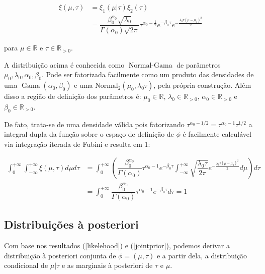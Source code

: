 \documentclass[a4paper]{article}
\newcommand{\op}[1]{{\operatorname{#1}}}
\begin{document}
  \begin{align}
  \xi(\mu,\tau)&=\xi_1(\mu|\tau)\xi_2(\tau)\nonumber\\
  &=\displaystyle\dfrac{\beta_0^{\alpha_0}\sqrt{\lambda_0}}{\Gamma(\alpha_0)\sqrt{2\pi}}\tau^{\alpha_0-\frac12}e^{-\beta_0\tau}e^{-\frac{\lambda_0\tau (\mu-\mu_0)^2}2}\label{jointprior}
  \end{align}
  \begin{center}para  $\mu\in\mathbb{R}$ e $\tau\in\mathbb{R}_{>0}$.\end{center}
\begin{definition}
	A distribuição acima é conhecida como $\op{Normal-Gama}$ de parâmetros $\mu_0,\lambda_0,\alpha_0,\beta_0$. Pode ser fatorizada facilmente como um produto das densidades de uma $\op{Gama}(\alpha_0,\beta_0)$ e uma $\op{Normal_2}(\mu_0,\lambda_0\tau)$, pela própria construção. Além disso a região de definição dos parâmetros é: $\mu_0\in\mathbb{R}$, $\lambda_0\in\mathbb{R}_{>0}$, $\alpha_0\in\mathbb{R}_{>0}$ e $\beta_0\in\mathbb{R}_{>0}$.\label{def1}
\end{definition}

De fato, trata-se de uma densidade válida pois fatorizando $\tau^{\alpha_0-1/2}=\tau^{\alpha_0-1}\tau^{1/2}$ a integral dupla da função sobre o espaço de definição de $\phi$ é facilmente calculável via integração iterada de Fubini\citep{wiki:Fubini's_theorem} e resulta em 1:

\begin{align*}
	\displaystyle \int_{0}^{+\infty}\int_{-\infty}^{+\infty}\xi(\mu,\tau)d\mu d\tau &=\int_{0}^{+\infty}\left(\dfrac{\beta_0^{\alpha_0}}{\Gamma(\alpha_0)}\tau^{\alpha_0-1}e^{-\beta_0\tau}\int_{-\infty}^{+\infty}\sqrt{\dfrac{\lambda_0\tau}{2\pi}}e^{-\frac{\lambda_0\tau (\mu-\mu_0)^2}2}d\mu\right)d\tau\\
	&=\int_{0}^{+\infty}\dfrac{\beta_0^{\alpha_0}}{\Gamma(\alpha_0)}\tau^{\alpha_0-1}e^{-\beta_0\tau}d\tau=1
\end{align*}


 
 
\subsection{Distribuições à posteriori}

Com base nos resultados (\ref{likelehood}) e (\ref{jointprior}), podemos derivar a distribuição à posteriori conjunta de $\phi=(\mu,\tau)$ e a partir dela, a distribuição condicional de $\mu|\tau$ e as marginais à posteriori de $\tau$ e $\mu$.
\end{document}
